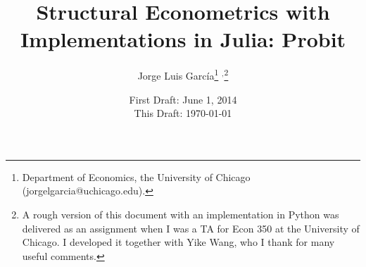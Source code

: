 



\title{\textbf{Structural Econometrics with Implementations in Julia: Probit}}
\author{Jorge Luis Garc\'{i}a\thanks{Department of Economics, the University of Chicago (jorgelgarcia@uchicago.edu).} $^{,}$\thanks{A rough version of this document with an implementation in Python was delivered as an assignment when I was a TA for Econ 350 at the University of Chicago. I developed it together with Yike Wang, who I thank for many useful comments.}}
\date{First Draft: June 1, 2014 \\ This Draft: \today}
\maketitle

\setcounter{section}{1}

